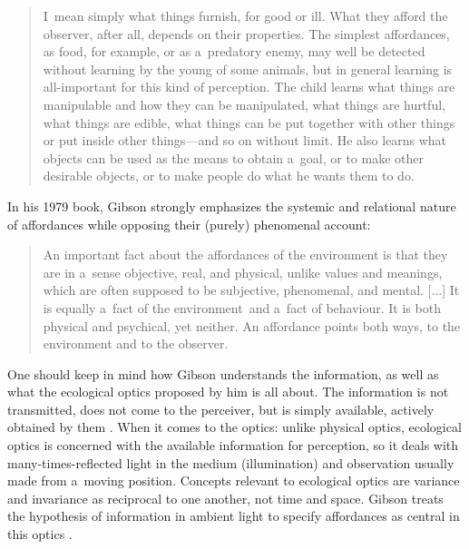 \documentclass[%
manuscript=article,
year=2024,
volume=77,
doi=10.59203/zfn.77.693,
]{zfn}
\begin{document}
\begin{quote}
I~mean simply what things furnish, for good or ill. What they afford the observer, after all, depends on their properties. The simplest affordances, as food, for example, or as a~predatory enemy, may well be detected without learning by the young of some animals, but in general learning is all-important for this kind of perception. The child learns what things are manipulable and how they can be manipulated, what things are hurtful, what things are edible, what things can be put together with other things or put inside other things---and so on without limit. He also learns what objects can be used as the means to obtain a~goal, or to make other desirable objects, or to make people do what he wants them to do. 
\parencite[][p.285]{gibson_senses_1966}%
\end{quote}




In his 1979 book, Gibson strongly emphasizes the systemic and relational nature of affordances while opposing their (purely) phenomenal account:



\begin{quote}
An important fact about the affordances of the environment is that they are in a~sense objective, real, and physical, unlike values and meanings, which are often supposed to be subjective, phenomenal, and mental. [...] It is equally a~fact of the environment~and a~fact of behaviour. It is both physical and psychical, yet neither. An affordance points both ways, to the environment and to the observer. 
\parencite[][p.129]{gibson_ecological_1979}%
\end{quote}




One should keep in mind how Gibson understands the information, as well as what the ecological optics proposed by him is all about. The information is not transmitted, does not come to the perceiver, but is simply available, actively obtained by them 
\parencite[][p.307]{gibson_ecological_1979}. %
 When it comes to the optics: unlike physical optics, ecological optics is concerned with the available information for perception, so it deals with many-times-reflected light in the medium (illumination) and observation usually made from a~moving position. Concepts relevant to ecological optics are variance and invariance as reciprocal to one another, not time and space. Gibson treats the hypothesis of information in ambient light to specify affordances as central in this optics 
\parencite[][pp.47–64, 307–309]{gibson_ecological_1979}.%
\end{document}
